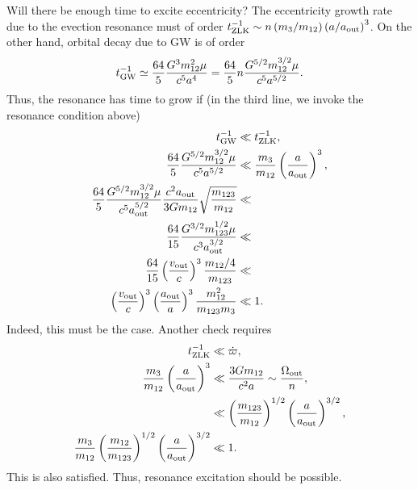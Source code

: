 \documentclass[10pt,
        usenames, %
        dvipsnames %
    ]{article}
\newcommand*{\p}[1]{\left(#1\right)}
\begin{document}
Will there be enough time to excite eccentricity? The eccentricity growth rate
due to the evection resonance must of order $t_{\rm ZLK}^{-1} \sim n \p{m_3 /
m_{12}} \p{a / a_{\rm out}}^3$. On the other hand, orbital decay due to GW is of
order
\begin{equation}
    t_{\rm GW}^{-1} \simeq \frac{64}{5}\frac{G^3m_{12}^2\mu}{c^5a^4}
        = \frac{64}{5}n\frac{G^{5/2}m_{12}^{3/2}\mu}{c^5a^{5/2}}.
\end{equation}
Thus, the resonance has time to grow if (in the third line, we invoke the
resonance condition above)
\begin{align}
    t_{\rm GW}^{-1} &\ll t_{\rm ZLK}^{-1},\\
    \frac{64}{5}\frac{G^{5/2}m_{12}^{3/2}\mu}{c^5a^{5/2}} &\ll
        \frac{m_3}{m_{12}}\p{\frac{a}{a_{\rm out}}}^3,\\
    \frac{64}{5}\frac{G^{5/2}m_{12}^{3/2}\mu}{c^5a_{\rm out}^{5/2}}
        \frac{c^2a_{\rm out}}{3Gm_{12}}\sqrt{\frac{m_{123}}{m_{12}}}
            &\ll\\
    \frac{64}{15} \frac{G^{3/2}m_{123}^{1/2}\mu}{c^3a_{\rm out}^{3/2}}&\ll\\
    \frac{64}{15}\p{\frac{v_{\rm out}}{c}}^3 \frac{m_{12} / 4}{m_{123}}
        &\ll\\
    \p{\frac{v_{\rm out}}{c}}^3\p{\frac{a_{\rm out}}{a}}^3
        \frac{m_{12}^2}{m_{123}m_3} &\ll 1.
\end{align}
Indeed, this must be the case. Another check requires
\begin{align}
    t_{\rm ZLK}^{-1} &\ll \dot{\varpi},\\
    \frac{m_3}{m_{12}}\p{\frac{a}{a_{\rm out}}}^3 &\ll \frac{3Gm_{12}}{c^2a}
        \sim \frac{\Omega_{\rm out}}{n},\\
    &\ll \p{\frac{m_{123}}{m_{12}}}^{1/2}\p{\frac{a}{a_{\rm out}}}^{3/2},\\
    \frac{m_3}{m_{12}}\p{\frac{m_{12}}{m_{123}}}^{1/2}\p{\frac{a}{a_{\rm
        out}}}^{3/2} &\ll 1.
\end{align}
This is also satisfied. Thus, resonance excitation should be possible.
\end{document}

